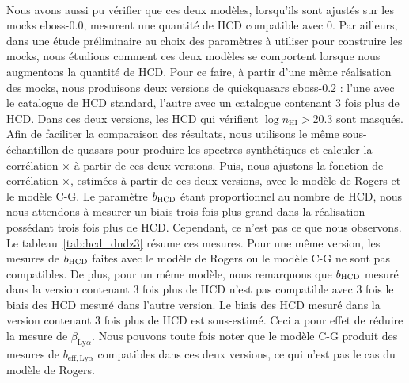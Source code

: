 \documentclass[11pt, twoside, a4paper, openright]{report}
\begin{document}
\paragraph{}
Nous avons aussi pu vérifier que ces deux modèles, lorsqu'ils sont ajustés sur les mocks eboss-0.0, mesurent une quantité de HCD compatible avec 0.
Par ailleurs, dans une étude préliminaire au choix des paramètres \lya{} à utiliser pour construire les mocks, nous étudions comment ces deux modèles se comportent lorsque nous augmentons la quantité de HCD.
Pour ce faire, à partir d'une même réalisation des mocks, nous produisons deux versions de quickquasars eboss-0.2 : l'une avec le catalogue de HCD standard, l'autre avec un catalogue contenant 3 fois plus de HCD. Dans ces deux versions, les HCD qui vérifient $\log n_{\mathrm{HI}} > \num{20.3}$ sont masqués. Afin de faciliter la comparaison des résultats, nous utilisons le même sous-échantillon de quasars pour produire les spectres synthétiques et calculer la corrélation \lya{}$\times$\lya{} à partir de ces deux versions.
Puis, nous ajustons la fonction de corrélation \lya{}$\times$\lya{}, estimées à partir de ces deux versions, avec le modèle de Rogers et le modèle C-G. Le paramètre $b_{\textsc{HCD}} $ étant proportionnel au nombre de HCD, nous nous attendons à mesurer un biais trois fois plus grand dans la réalisation possédant trois fois plus de HCD.
Cependant, ce n'est pas ce que nous observons. Le tableau~\ref{tab:hcd_dndz3} résume ces mesures.
Pour une même version, les mesures de $b_{\textsc{HCD}}$ faites avec le modèle de Rogers ou le modèle C-G ne sont pas compatibles.
De plus, pour un même modèle, nous remarquons que $b_{\textsc{HCD}}$  mesuré dans la version contenant 3 fois plus de HCD n'est pas compatible avec 3 fois le biais des HCD mesuré dans l'autre version. Le biais des HCD mesuré dans la version contenant 3 fois plus de HCD est sous-estimé.
Ceci a pour effet de réduire la mesure de $\beta_{\mathrm{Ly}\alpha}$.
Nous pouvons toute fois noter que le modèle C-G produit des mesures de $b_{\mathrm{eff},\mathrm{Ly}\alpha}$ compatibles dans ces deux versions, ce qui n'est pas le cas du modèle de Rogers.
\end{document}
